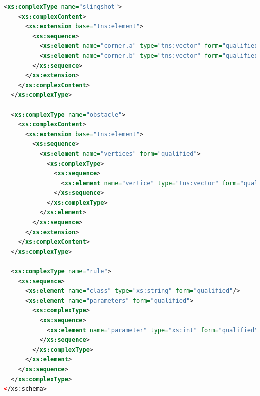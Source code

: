 \documentclass[fontsize=12pt,
               paper=a4,
               twoside=false,
               parskip=half,
               ]{scrartcl}
\begin{document}
\begin{lstlisting}[language=xml,label=lst:default_playfield,caption={schema for playfields.xml}]
  <xs:complexType name="slingshot">
    <xs:complexContent>
      <xs:extension base="tns:element">
        <xs:sequence>
          <xs:element name="corner.a" type="tns:vector" form="qualified"/>
          <xs:element name="corner.b" type="tns:vector" form="qualified"/>
        </xs:sequence>
      </xs:extension>
    </xs:complexContent>
  </xs:complexType>

  <xs:complexType name="obstacle">
    <xs:complexContent>
      <xs:extension base="tns:element">
        <xs:sequence>
          <xs:element name="vertices" form="qualified">
            <xs:complexType>
              <xs:sequence>
                <xs:element name="vertice" type="tns:vector" form="qualified" maxOccurs="unbounded"/>
              </xs:sequence>
            </xs:complexType>
          </xs:element>
        </xs:sequence>
      </xs:extension>
    </xs:complexContent>
  </xs:complexType>

  <xs:complexType name="rule">
    <xs:sequence>
      <xs:element name="class" type="xs:string" form="qualified"/>
      <xs:element name="parameters" form="qualified">
        <xs:complexType>
          <xs:sequence>
            <xs:element name="parameter" type="xs:int" form="qualified" maxOccurs="unbounded"/>
          </xs:sequence>
        </xs:complexType>
      </xs:element>
    </xs:sequence>
  </xs:complexType>
</xs:schema>
\end{lstlisting}
\end{document}

